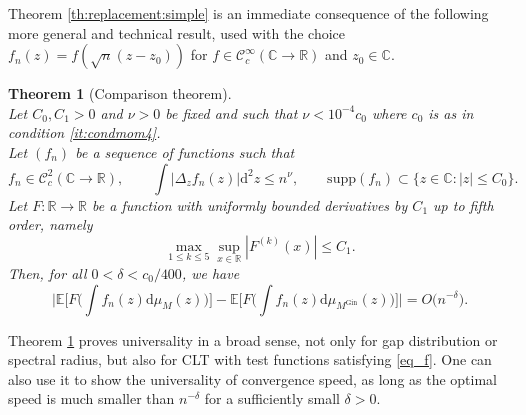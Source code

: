 \documentclass[10pt,reqno]{amsart}
\newcommand{\R}{{\mathbb{R}}}
\newcommand{\C}{{\mathbb{C}}}
\newcommand{\dd}{\mathrm{d}}
\newcommand{\<}{\langle}
\renewcommand{\>}{\rangle}
\newcommand{\MG}{M^{\mathrm{Gin}}}
\newcommand{\DGZ}[1]{{\color{green!50!black!50} #1}}
\numberwithin{equation}{section}
\newtheorem{theorem}{Theorem}[section]%
\begin{document}
Theorem \ref{th:replacement:simple} is an immediate consequence of the following more general and technical result, used with the choice $f_n(z)=f(\sqrt{n}(z-z_0))$ for $f\in\mathcal{C}^\infty_c(\C\to\mathbb{R})$ and $z_0 \in \C$.

    
\begin{theorem}[Comparison theorem]\label{th:replacement}\ \\
     Let $C_0,C_1>0$ and $\nu>0$ be fixed and such that $\nu<10^{-4}c_0$ where $c_0$ is as in condition \textup{\ref{it:condmom4}}.\\
     Let ${(f_n)}$ be a sequence of functions such that 
     \begin{equation}\label{eq_f}
     f_n \in\mathcal{C}_c^{2}(\C\to\mathbb{R}),\qquad
     \int|\Delta_z f_n(z)| \dd^2 z  \leq n^{\nu}, \qquad \mathrm{supp}(f_n) \subset\{z\in\mathbb{C}:|z|\leq C_0\}.
     \end{equation}
     Let $F:\mathbb{R}\to\mathbb{R}$ be a function with uniformly bounded derivatives by $C_1$ up to fifth order, namely
     \begin{equation}\label{eq_F}
     \max_{1\leq k\leq 5}\sup_{x\in \R} |F^{(k)}(x)| \leq C_1.
     \end{equation}
     Then, for all  $0<\delta<c_0/400$, we have
    \[
    \Bigr|\mathbb{E}\Bigr[F\Bigr(  \int f_n(z)\dd\mu_M(z)\Bigr)\Bigr]
    -\mathbb{E}\Bigr[F\Bigr( \int f_n(z)\dd\mu_{\MG}(z)\Bigr)\Bigr]\Bigr| =O\big( n^{-\delta}\big).
    \]
\end{theorem}



Theorem \ref{th:replacement} proves universality in a broad sense, not only for gap distribution or spectral radius, but also for CLT with test functions satisfying \eqref{eq_f}. One can also use it to show the universality of convergence speed, as long as the optimal speed is much smaller than $n^{-\delta}$ for a sufficiently small $\delta>0$.

\end{document}
